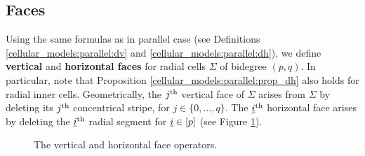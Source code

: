 \subsection{Faces}
\label{cellular_models:radial:faces}

Using the same formulas as in parallel case (see Definitions \ref{cellular_models:parallel:dv} and \ref{cellular_models:parallel:dh}), 
we define \textbf{vertical} and \textbf{horizontal faces} for radial cells $\Sigma$ of bidegree $(p, q)$.
In particular, note that Proposition \ref{cellular_models:parallel:prop_dh} also holds for radial inner cells.
Geometrically, the $j^{\text{th}}$ vertical face of $\Sigma$ arises from $\Sigma$ by deleting its $j^{\text{th}}$ concentrical stripe, 
for $j \in \{0, \dotsc, q\}$.
The $\underline{\smash{i}}^{\text{th}}$ horizontal face arises by deleting the $\underline{\smash{i}}^{\text{th}}$ radial segment for $\underline{\smash{i}} \in [p]$ (see Figure \ref{cellular_models:radial:comparison_face_operators}).
\begin{figure}[ht]
\centering
{}
\caption{\label{cellular_models:radial:comparison_face_operators}The vertical and horizontal face operators.}
\end{figure}
